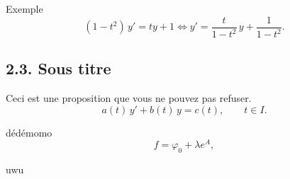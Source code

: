 \documentclass[a4paper,11pt]{article}
\begin{document}
\begin{exemples}[Exemple]
Exemple
\[
(1 - t^2)\,y' = t y + 1 \iff y' = \frac{t}{1 - t^2}\,y + \frac{1}{1 - t^2}.
\]
\end{exemples}

\subsection*{2.3. Sous titre}

\begin{proposition}
Ceci est une proposition que vous ne pouvez pas refuser.
\[
a(t)\,y' + b(t)\,y = c(t), \qquad t \in I.
\]

\end{proposition}

\begin{demonstration}
dédémomo\[
f = \varphi_0 + \lambda e^{A},
\]

\end{demonstration}

\begin{remarque}
uwu
\end{remarque}
\end{document}
